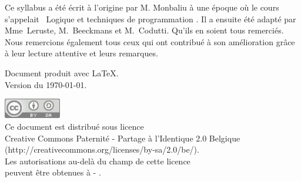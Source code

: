 \clearpage
\thispagestyle{empty}

\vfill

Ce syllabus a été écrit à l'origine par M. Monbaliu
à une époque où le cours s'appelait 
\og\ Logique et techniques de programmation \fg.
Il a ensuite été adapté par Mme~Leruste, M.~Beeckmans et M.~Codutti.
Qu'ils en soient tous remerciés.
Nous remercions également tous ceux qui ont contribué à son amélioration
grâce à leur lecture attentive et leurs remarques. 

\bigskip
Document produit avec \LaTeX.
\\Version du \today.

\vfill

\includegraphics[width=25mm]{image/cc-gris}
\\
Ce document est distribué sous licence 
\\Creative Commons Paternité - Partage à l'Identique 2.0 Belgique 
\\(http://creativecommons.org/licenses/by-sa/2.0/be/).
\\Les autorisations au-delà du champ de cette licence
\\peuvent être obtenues à \entitesite{} - \texttt{\contact}.
\pagestyle{fancy}

\setcounter{tocdepth}{1}
\tableofcontents{}

